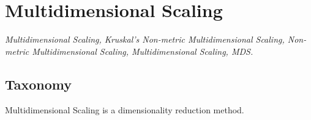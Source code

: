 
\section{Multidimensional Scaling} 
\label{sec:mds}


\emph{Multidimensional Scaling, Kruskal's Non-metric Multidimensional Scaling, Non-metric Multidimensional Scaling, Multidimensional Scaling, MDS.}

\subsection{Taxonomy}
Multidimensional Scaling is a dimensionality reduction method.

